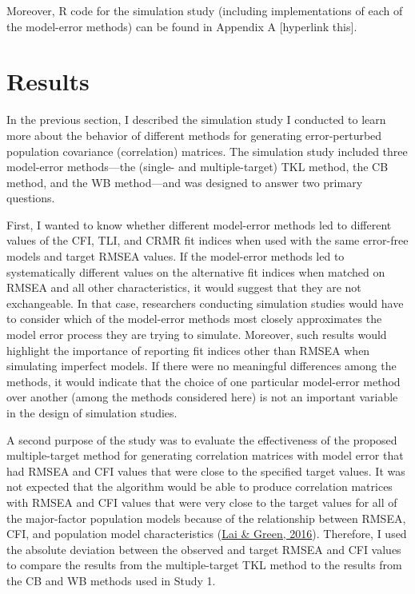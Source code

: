 \documentclass[11pt]{umnthesis}
\begin{document}
Moreover, R code for the simulation study (including implementations of each of the model-error methods) can be found in Appendix A {[}hyperlink this{]}.

\hypertarget{results}{%
\chapter{Results}\label{results}}

In the previous section, I described the simulation study I conducted to learn more about the behavior of different methods for generating error-perturbed population covariance (correlation) matrices. The simulation study included three model-error methods---the (single- and multiple-target) TKL method, the CB method, and the WB method---and was designed to answer two primary questions.

First, I wanted to know whether different model-error methods led to different values of the CFI, TLI, and CRMR fit indices when used with the same error-free models and target RMSEA values. If the model-error methods led to systematically different values on the alternative fit indices when matched on RMSEA and all other characteristics, it would suggest that they are not exchangeable. In that case, researchers conducting simulation studies would have to consider which of the model-error methods most closely approximates the model error process they are trying to simulate. Moreover, such results would highlight the importance of reporting fit indices other than RMSEA when simulating imperfect models. If there were no meaningful differences among the methods, it would indicate that the choice of one particular model-error method over another (among the methods considered here) is not an important variable in the design of simulation studies.

A second purpose of the study was to evaluate the effectiveness of the proposed multiple-target method for generating correlation matrices with model error that had RMSEA and CFI values that were close to the specified target values. It was not expected that the algorithm would be able to produce correlation matrices with RMSEA and CFI values that were very close to the target values for all of the major-factor population models because of the relationship between RMSEA, CFI, and population model characteristics (\protect\hyperlink{ref-lai2016}{Lai \& Green, 2016}). Therefore, I used the absolute deviation between the observed and target RMSEA and CFI values to compare the results from the multiple-target TKL method to the results from the CB and WB methods used in Study 1.
\end{document}
